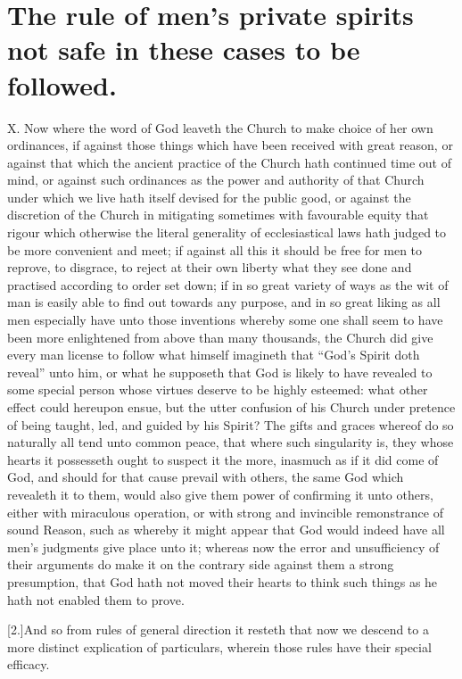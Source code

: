 \section*{The rule of men’s private spirits not safe in these cases to be followed.}
X. Now where the word of God leaveth the Church to make choice of her own ordinances, if against those things which have been received with great reason, or against that which the ancient practice of the Church hath continued time out of mind, or against such ordinances as the power and authority of that Church under which we live hath itself devised for the public good, or against the discretion of the Church in mitigating sometimes with favourable equity that rigour which otherwise the literal generality of ecclesiastical laws hath judged to be more convenient and meet; if against all this it should be free for men to reprove, to disgrace, to reject at their own liberty what they see done and practised according to order set down; if in so great variety of ways as the wit of man is easily able to find out towards any purpose, and in so great liking as all men especially have unto those inventions whereby some one shall seem to have been more enlightened from above than many thousands, the Church did give every man license to follow what himself imagineth that “God’s Spirit doth reveal” unto him, or what he supposeth that God is likely to have revealed to some special person whose virtues deserve to be highly esteemed: what other effect could hereupon ensue, but the utter confusion of his Church under pretence of being taught, led, and guided by his Spirit? The gifts and graces whereof do so naturally all tend unto common peace, that where such singularity is, they whose hearts it possesseth ought to suspect it the more, inasmuch as if it did come of God, and should for that cause prevail with others, the same God which revealeth it to them, would also give them power of confirming it unto others, either with miraculous operation, or with strong and invincible remonstrance of sound Reason, such as whereby it might appear that God would indeed have all men’s judgments give place unto it; whereas now the error and unsufficiency of their arguments do make it on the contrary side against them a strong presumption, that God hath not moved their hearts to think such things as he hath not enabled them to prove.

[2.]And so from rules of general direction it resteth that  now we descend to a more distinct explication of particulars, wherein those rules have their special efficacy.


